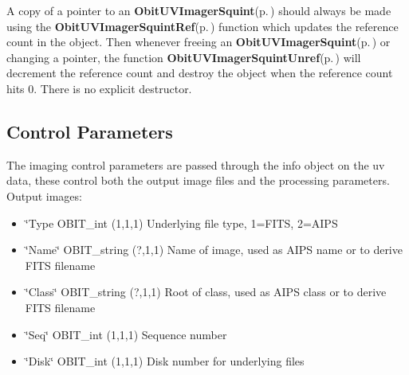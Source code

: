 A copy of a pointer to an {\bf Obit\-UVImager\-Squint}{\rm (p.\,\pageref{structObitUVImagerSquint})} should always be made using the {\bf Obit\-UVImager\-Squint\-Ref}{\rm (p.\,\pageref{ObitUVImagerSquint_8h_a1})} function which updates the reference count in the object. Then whenever freeing an {\bf Obit\-UVImager\-Squint}{\rm (p.\,\pageref{structObitUVImagerSquint})} or changing a pointer, the function {\bf Obit\-UVImager\-Squint\-Unref}{\rm (p.\,\pageref{ObitUVImagerSquint_8h_a0})} will decrement the reference count and destroy the object when the reference count hits 0. There is no explicit destructor.\subsection{Control Parameters}\label{ObitUVImagerSquint_8h_ObitUVImagerSquintparameters}
The imaging control parameters are passed through the info object on the uv data, these control both the output image files and the processing parameters. Output images: \begin{itemize}
\item \char`\"{}Type OBIT\_\-int (1,1,1) Underlying file type, 1=FITS, 2=AIPS \item \char`\"{}Name\char`\"{} OBIT\_\-string (?,1,1) Name of image, used as AIPS name or to derive FITS filename \item \char`\"{}Class\char`\"{} OBIT\_\-string (?,1,1) Root of class, used as AIPS class or to derive FITS filename \item \char`\"{}Seq\char`\"{} OBIT\_\-int (1,1,1) Sequence number \item \char`\"{}Disk\char`\"{} OBIT\_\-int (1,1,1) Disk number for underlying files\end{itemize}
